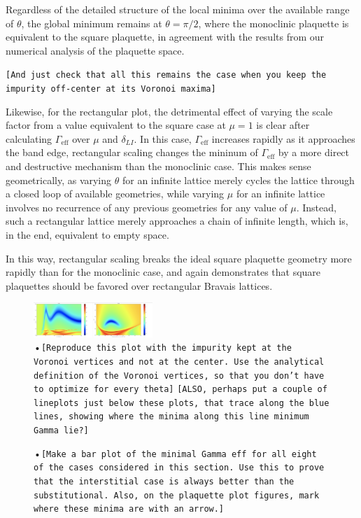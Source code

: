\documentclass[aps,pra,superscriptaddress,twocolumn]{revtex4-1}
\newcommand{\commentSB}[1]{\texttt{\color{blue}[#1]}}
\newcommand{\commentTP}[1]{\texttt{\color{green}[#1]}}
\begin{document}
Regardless of the detailed structure of the local minima over the available range of $\theta$, the global minimum remains at $\theta = \pi/2$, where the monoclinic plaquette is equivalent to the square plaquette, in agreement with the results from our numerical analysis of the plaquette space. 

\commentSB{And just check that all this remains the case when you keep the impurity off-center at its Voronoi maxima}

Likewise, for the rectangular plot, the detrimental effect of varying the scale factor from a value equivalent to the square case at $\mu = 1$ is clear after calculating $\Gamma_\text{eff}$ over $\mu$ and $\delta_{LI}$. In this case, $\Gamma_\text{eff}$ increases rapidly as it approaches the band edge, rectangular scaling changes the mininum of $\Gamma_\text{eff}$ by a more direct and destructive mechanism than the monoclinic case. This makes sense geometrically, as varying $\theta$ for an infinite lattice merely cycles the lattice through a closed loop of available geometries, while varying $\mu$ for an infinite lattice involves no recurrence of any previous geometries for any value of $\mu$. Instead, such a rectangular lattice merely approaches a chain of infinite length, which is, in the end, equivalent to empty space. 

In this way, rectangular scaling breaks the ideal square plaquette geometry more rapidly than for the monoclinic case, and again demonstrates that square plaquettes should be favored over rectangular Bravais lattices. 


\begin{figure}
    \centering
    \includegraphics[width=0.4\textwidth]{figures/mono_rect_thetadelta.png} 
    \caption{•\commentTP{Reproduce this plot with the impurity kept at the Voronoi vertices and not at the center. Use the analytical definition of the Voronoi vertices, so that you don't have to optimize for every theta} \commentSB{ALSO, perhaps put a couple of lineplots just below these plots, that trace along the blue lines, showing where the minima along this line minimum Gamma lie?}}
    \label{fig:mono_rect_thetadelta}
\end{figure}

\begin{figure}
    \centering
    \caption{•\commentTP{Make a bar plot of the minimal Gamma eff for all eight of the cases considered in this section. Use this to prove that the interstitial case is always better than the substitutional. Also, on the plaquette plot figures, mark where these minima are with an arrow.}}
    \label{fig:mono_rect_thetadelta}
\end{figure}
\end{document}
